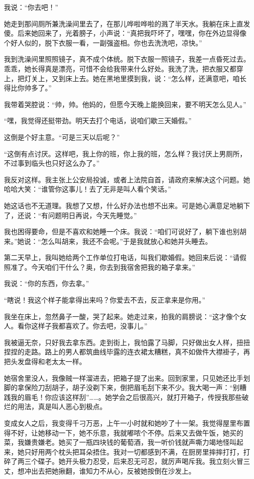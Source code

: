 我说：“你去吧！” 

她走到那间厕所兼洗澡间里去了，在那儿哗啦哗啦的溅了半天水。我躺在床上直发傻。后来她回来了，光着膀子，小声说：“真把我吓坏了，嘿嘿，你在外边显得像个好人似的，脱下衣服一看，一副强盗相。你也去洗洗吧，凉快。” 

我到洗澡间里照照镜子，真不成个体统。脱下衣服一照镜子，我差一点昏死过去。乖乖，她长得真是漂亮，可惜不会给我带来什么好处。我洗了洗，把衣服又都穿上，把灯关上，又到床上去。她在黑地里摸到我，说：“怎么样，还满意吧，咱长得比你帅多了。” 

我带着哭腔说：“帅，帅。他妈的，但愿今天晚上能换回来，要不明天怎么见人。” 

“嘿，我觉得还挺带劲。明天去打个电话，说咱们歇三天婚假。” 

这倒是个好主意。“可是三天以后呢？” 

“这倒有点讨厌。这样吧，我上你的班，你上我的班，怎么样？我讨厌上男厕所，不过事到临头也只好这么办了。” 

我反对这样。我主张上公安局投诚，或者上法院自首，请政府来解决这个问题。她哈哈大笑：“谁管你这事儿！去了无非是叫人看个笑话。” 

她这话也不无道理。我想了又想，什么好办法也想不出来。可是她心满意足地躺下了，还说：“有问题明日再说，今天先睡觉。” 

我也困得要命，但是不喜欢和她睡一个床。我说：“咱们可说好了，躺下谁也别胡来。”她说：“怎么叫胡来，我还不会呢。”于是我就放心和她并头睡去。 

第二天早上，我叫她给两个工作单位打电话，叫我们歇婚假。她回来后说：“请假照准了。今天咱们干什么？奥，你去到我宿舍把我的箱子拿来。” 

我说：“你的东西，你去拿。” 

“瞎说！我这个样子能拿得出来吗？你爱去不去，反正拿来是你用。” 

我坐在床上，忽然鼻子一酸，哭了起来。她走过来，拍我的肩膀说：“这才像个女人。看你这样子我都喜欢了。你去吧，没事儿。” 

我被逼无奈，只好我去拿东西。走到街上，我怕露了马脚，只好做出女人样，扭扭捏捏的走路。路上的男人都筑曲线毕露的连衣裙太糟糕，真不如做件大襟褂子，再把头发盘得和老太太一样。 

她宿舍里没人，我像贼一样溜进去，把箱子提了出来。回到家里，只见她还比手划脚的拿保险刀刮胡子，胡子没剃下来，倒把眉毛刮下来不少。我大喝一声：“别糟践我的眉毛！你应该这样刮”……。她学会之后很高兴，就打开箱子，传授我那些破烂的用法，真是叫人恶心到极点。 

变成女人之后，我变得千刁万恶，上午一小时就和她吵了十一架。我觉得屋里布置得不好，让她移动一下，她不乐意，我就嘟哝个不停。后来又去做午饭，她买的菜，我嫌贵嫌老。她买了一瓶四块钱的葡萄酒，我一听价钱就声嘶力竭地怪叫起来，她只好用两个枕头把耳朵捂住。我对一切都感到不满，在厨房里摔摔打打，打碎了两三个碟子。她开头极力忍受，后来忍无可忍，就厉声喝斥我。我立刻火冒三丈，想冲出去把她揪翻，谁知力不从心，反被她按倒在沙发上。 

